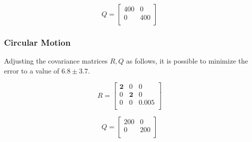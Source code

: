 	
	\[
	Q =
	\begin{bmatrix}
	    400  & 0 \\
	    0    & 400 \\
	
	\end{bmatrix}
	\]

	\subsubsection{Circular Motion}
	
	Adjusting the covariance matrices $R,Q$ as follows, it is possible to minimize the error to a value of $6.8 \pm 3.7$.
	
		\[
	R =
	\begin{bmatrix}
	    \mathbf{2}  		& 0		& 0 \\
	    0       & \mathbf{2} 	& 0 \\
	    0       & 0 	& \mathbf{0.005} \\
	
	\end{bmatrix}
	\]
	
	
	\[
	Q =
	\begin{bmatrix}
	    200  & 0 \\
	    0    & 200 \\
	
	\end{bmatrix}
	\]